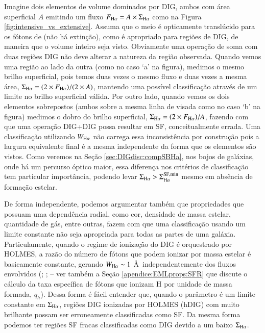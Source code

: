 Imagine dois elementos de volume dominados por DIG, ambos com área superficial $A$ emitindo um fluxo $F_{\Ha}=A\times\Sigma_{\Ha}$ como na Figura \ref{fig:intensive_vs_extensive}. Assuma que o meio é opticamente translúcido para os fótons de \Ha (não há extinção), como é apropriado para regiões de DIG, de maneira que o volume inteiro seja visto. Obviamente uma operação de soma com duas regiões DIG não deve alterar a natureza da região observada. Quando vemos uma região ao lado da outra (como no caso `a' na figura), medimos o mesmo brilho superficial, pois temos duas vezes o mesmo fluxo e duas vezes a mesma área, $\Sigma_{\Ha}=(2 \times F_{\Ha})/(2 \times A)$, mantendo uma possível classificação através de um limite no brilho superficial válida. Por outro lado, quando vemos os dois elementos sobrepostos (ambos sobre a mesma linha de visada como no caso `b' na figura) medimos o dobro do brilho superficial, $\Sigma_{\Ha}=(2 \times F_{\Ha})/A$, fazendo com que uma operação DIG+DIG possa resultar em SF, conceitualmente errada.
Uma classificação utilizando $W_{\Ha}$ não carrega essa inconsistência por construção pois a largura equivalente final é a mesma independente da forma que os elementos são vistos. Como veremos na Seção \ref{sec:DIGdisc:compSBHa}, nos bojos de galáxias, onde há um percurso óptico maior, essa diferença nos critérios de classificação tem particular importância, podendo levar $\Sigma_{\Ha} > \Sigma_{\Ha}^{\rm SF,min}$ mesmo em absência de formação estelar.

De forma independente, podemos argumentar também que propriedades que possuam uma dependência radial, como cor, densidade de massa estelar, quantidade de gás, entre outras, fazem com que uma classificação usando um limite constante não seja apropriada para todas as partes de uma galáxia. Particulamente, quando o regime de ionização do DIG é orquestrado por HOLMES, a razão do número de fótons que podem ionizar \Ha por massa estelar é basicamente constante, gerando $W_{\Ha} \sim 1$ \AA\ independentemente dos fluxos envolvidos (\citealt{Binette.etal.1994a}; \citealt{CidFernandes.etal.2011a}; \citealt{Belfiore.etal.2016} -- ver também a Seção \ref{apendice:EMLprops:SFR} que discute o cálculo da taxa específica de fótons que ionizam H por unidade de massa formada, $q_h$). Dessa forma é fácil entender que, quando o parâmetro é um limite constante em $\Sigma_{\Ha}$, regiões DIG ionizadas por HOLMES (hDIG) com \Ha muito brilhante possam ser erroneamente classificadas como SF. Da mesma forma podemos ter regiões SF fracas classificadas como DIG devido a um baixo $\Sigma_{\Ha}$.



